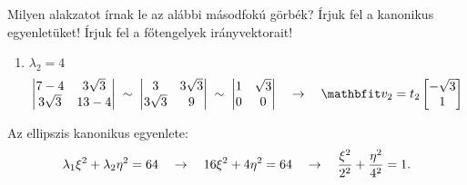 \begin{exercise}{%
    Milyen alakzatot írnak le az alábbi másodfokú görbék?
    Írjuk fel a kanonikus egyenletüket!
    Írjuk fel a főtengelyek irányvektorait!
  }
{\begin{enumerate}[a)]
\begin{enumerate}[1)]
\[\begin{vmatrix}
                      \end{vmatrix}
                      \quad \rightarrow \quad
                      \rvec v_1 = t_1 \begin{bmatrix}
                        1 \\ \sqrt{3}
                      \end{bmatrix}
                    \]
              \item $\lambda_2 = 4$
                    \[
                      \begin{vmatrix}
                        7 - 4      & 3 \sqrt{3} \\
                        3 \sqrt{3} & 13 - 4
                      \end{vmatrix} \;\sim\; \begin{vmatrix}
                        3          & 3 \sqrt{3} \\
                        3 \sqrt{3} & 9
                      \end{vmatrix} \;\sim\; \begin{vmatrix}
                        1 & \sqrt{3} \\
                        0 & 0
                      \end{vmatrix}
                      \quad \rightarrow \quad
                      \rvec v_2 = t_2 \begin{bmatrix}
                        -\sqrt{3} \\ 1
                      \end{bmatrix}
                    \]
            \end{enumerate}

            Az ellipszis kanonikus egyenlete:
            \[
              \lambda_1 \xi^2 + \lambda_2 \eta^2 = 64
              \quad \rightarrow \quad
              16 \xi^2 + 4 \eta^2 = 64
              \quad \rightarrow \quad
              \frac{\xi^2}{2^2} + \frac{\eta^2}{4^2} = 1
              \text.
            \]

            \begin{center}
\end{center}
\end{enumerate}}
\end{exercise}
